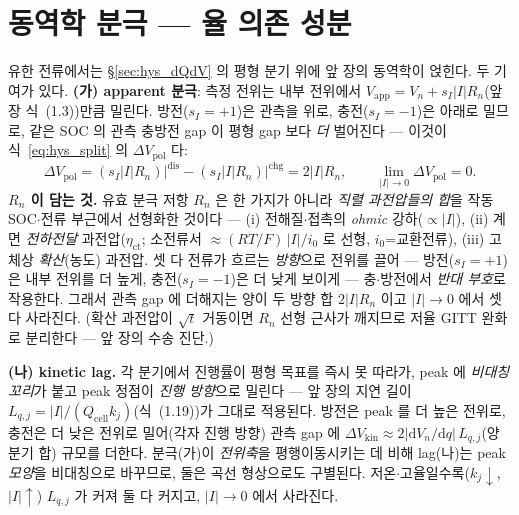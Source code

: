 \documentclass[11pt,a4paper]{article}
\newcommand{\dd}{\mathrm{d}}
\newcommand{\app}{\mathrm{app}}
\newcommand{\cell}{\mathrm{cell}}
\newcommand{\dis}{\mathrm{dis}}
\newcommand{\chg}{\mathrm{chg}}
\newcommand{\pol}{\mathrm{pol}}
\newcommand{\kin}{\mathrm{kin}}
\begin{document}
\section{동역학 분극 — 율 의존 성분}\label{sec:hys_pol}
유한 전류에서는 \S\ref{sec:hys_dQdV} 의 평형 분기 위에 앞 장의 동역학이 얹힌다. 두 기여가 있다. \textbf{(가)
apparent 분극}: 측정 전위는 내부 전위에서 $V_\app=V_n+s_I|I|R_n$(앞 장 식~(1.3))만큼 밀린다. 방전($s_I=+1$)은
관측을 위로, 충전($s_I=-1$)은 아래로 밀므로, 같은 SOC 의 관측 충방전 gap 이 평형 gap 보다 \emph{더} 벌어진다 —
이것이 식~\eqref{eq:hys_split} 의 $\Delta V_\pol$ 다:
\begin{equation}
\Delta V_\pol=(s_I|I|R_n)\big|^\dis-(s_I|I|R_n)\big|^\chg=2|I|R_n,\qquad \lim_{|I|\to0}\Delta V_\pol=0.
\label{eq:hys_pol}
\end{equation}
\textbf{$R_n$ 이 담는 것.} 유효 분극 저항 $R_n$ 은 한 가지가 아니라 \emph{직렬 과전압들의 합}을 작동
SOC$\cdot$전류 부근에서 선형화한 것이다 — (i) 전해질$\cdot$접촉의 \emph{ohmic} 강하($\propto|I|$), (ii) 계면
\emph{전하전달} 과전압($\eta_\mathrm{ct}$; 소전류서 $\approx(RT/F)\,|I|/i_0$ 로 선형, $i_0$=교환전류), (iii) 고체상
\emph{확산}(농도) 과전압. 셋 다 전류가 흐르는 \emph{방향}으로 전위를 끌어 — 방전($s_I=+1$)은 내부 전위를 더
높게, 충전($s_I=-1$)은 더 낮게 보이게 — 충$\cdot$방전에서 \emph{반대 부호}로 작용한다. 그래서 관측 gap 에 더해지는
양이 두 방향 합 $2|I|R_n$ 이고 $|I|\to0$ 에서 셋 다 사라진다. (확산 과전압이 $\sqrt t$ 거동이면 $R_n$ 선형
근사가 깨지므로 저율 GITT 완화로 분리한다 — 앞 장의 수송 진단.)

\textbf{(나) kinetic lag.} 각 분기에서 진행률이 평형 목표를 즉시 못 따라가, peak 에 \emph{비대칭 꼬리}가 붙고 peak
정점이 \emph{진행 방향}으로 밀린다 — 앞 장의 지연 길이 $L_{q,j}=|I|/(Q_\cell k_j)$(식~(1.19))가 그대로 적용된다.
방전은 peak 를 더 높은 전위로, 충전은 더 낮은 전위로 밀어(각자 진행 방향) 관측 gap 에 $\Delta V_\kin\approx
2|\dd V_n/\dd q|\,L_{q,j}$(양 분기 합) 규모를 더한다. 분극(가)이 \emph{전위축}을 평행이동시키는 데 비해 lag(나)는 peak
\emph{모양}을 비대칭으로 바꾸므로, 둘은 곡선 형상으로도 구별된다. 저온$\cdot$고율일수록($k_j\downarrow$,
$|I|\uparrow$) $L_{q,j}$ 가 커져 둘 다 커지고, $|I|\to0$ 에서 사라진다.
\end{document}
